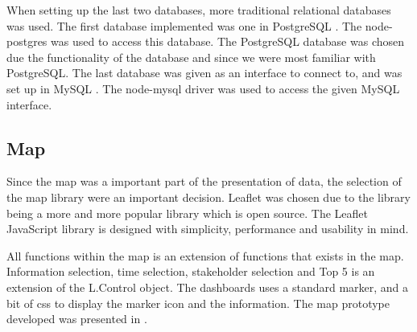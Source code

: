 When setting up the last two databases, more traditional relational databases 
was used. The first database implemented was one in PostgreSQL
\cite{postgreSQLAbout}. The node-postgres\cite{node-postgres} was used to 
access this database. The PostgreSQL database was chosen due the functionality 
of the database and since we were most familiar with PostgreSQL. The 
last database was given as an interface to connect to, and was set up in MySQL
\cite{mySQLAbout}. The node-mysql\cite{node-mysql} driver was used to access 
the given MySQL interface.

\subsection{Map} %
\label{sub:map}
Since the map was a important part of the presentation of data, the selection
of the map library were an important decision. Leaflet\cite{leaflet} was 
chosen due to the library being a more and more popular library which is open 
source. The Leaflet JavaScript library is designed with simplicity, 
performance and usability in mind.

All functions within the map is an extension of functions that exists in the
map. Information selection, time selection, stakeholder selection and Top 5 is
an extension of the L.Control object. The dashboards uses a standard marker,
and a bit of css to display the marker icon and the information. The map
prototype developed was presented in .


